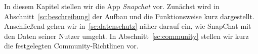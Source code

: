 In diesem Kapitel stellen wir die App \emph{Snapchat} vor. Zun\"achst wird in
Abschnitt~\ref{sc:beschreibung} der Aufbau und die Funktionsweise kurz
dargestellt. Anschlie{\ss}end gehen wir in~\ref{sc:datenschutz} n\"aher darauf
ein, wie SnapChat mit den Daten seiner Nutzer umgeht. In
Abschnitt~\ref{sc:community} stellen wir kurz die festgelegten
Community-Richtlinen vor.
